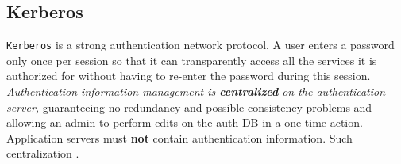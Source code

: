 \subsection{Kerberos}
\label{subsec:kerberos}
\texttt{Kerberos} is a strong authentication network protocol. 
A user enters a password only once per session so that it can transparently access all the
services it is authorized for without having to re-enter the password during this session.
\textit{Authentication information management is \textbf{centralized} on the authentication server,}
guaranteeing no redundancy and possible consistency problems and allowing an admin to perform edits on the auth DB in a one-time action.\\
Application servers must \textbf{not} contain authentication information.
Such centralization .

